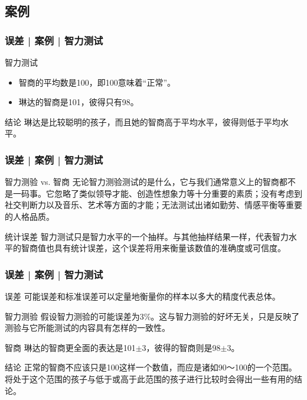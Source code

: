 \subsection{案例}
\begin{frame}
  \frametitle{误差 | 案例 | 智力测试}
  \begin{block}{智力测试}
    \begin{itemize}
      \item 智商的平均数是100，即100意味着“正常”。
      \item 琳达的智商是101，彼得只有98。
    \end{itemize}
  \end{block}
  \pause
  \begin{block}{结论}
    琳达是比较聪明的孩子，而且她的智商高于平均水平，彼得则低于平均水平。
  \end{block}
\end{frame}

\begin{frame}
  \frametitle{误差 | 案例 | 智力测试}
  \begin{block}{智力测验 vs. 智商}
    无论智力测验测试的是什么，它与我们通常意义上的智商都不是一码事。它忽略了类似领导才能、创造性想象力等十分重要的素质；没有考虑到社交判断力以及音乐、艺术等方面的才能；无法测试出诸如勤劳、情感平衡等重要的人格品质。
  \end{block}
  \pause
  \begin{block}{统计误差}
    智力测试只是智力水平的一个抽样。与其他抽样结果一样，代表智力水平的智商值也具有统计误差，这个误差将用来衡量该数值的准确度或可信度。
  \end{block}
\end{frame}

\begin{frame}
  \frametitle{误差 | 案例 | 智力测试}
  \begin{block}{误差}
    可能误差和标准误差可以定量地衡量你的样本以多大的精度代表总体。
  \end{block}
  \pause
  \begin{block}{智力测验}
    假设智力测验的可能误差为3\%。这与智力测验的好坏无关，只是反映了测验与它所能测试的内容具有怎样的一致性。
  \end{block}
  \pause
  \begin{block}{智商}
    琳达的智商更全面的表达是101$\pm$3，彼得的智商则是98$\pm$3。
  \end{block}
  \pause
  \begin{block}{结论}
    正常的智商不应该只是100这样一个数值，而应是诸如90～100的一个范围。将处于这个范围的孩子与低于或高于此范围的孩子进行比较时会得出一些有用的结论。
  \end{block}
\end{frame}

